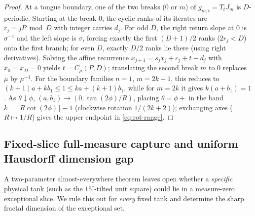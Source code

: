 \documentclass[11pt,reqno]{amsart}
\theoremstyle{definition}
\theoremstyle{remark}
\begin{document}
\begin{proof}
At a tongue boundary, one of the two breaks ($0$ or $m$) of $g_{m,t} = T_t J_m$ is $D$-periodic. Starting at the break $0$, the cyclic ranks of its iterates are $r_j = jP \bmod D$ with integer carries $d_j$. For odd $D$, the right return slope at $0$ is $\sigma^{-1}$ and the left slope is $\sigma$, forcing exactly the first $(D+1)/2$ ranks ($2r_j < D$) onto the first branch; for even $D$, exactly $D/2$ ranks lie there (using right derivatives). Solving the affine recurrence $x_{j+1} = s_j x_j + c_j + t - d_j$ with $x_0 = x_D = 0$ yields $t = C_\mu(P,D)$; translating the second break $m$ to $0$ replaces $\mu$ by $\mu^{-1}$. For the boundary families $n = 1$, $m = 2k+1$, this reduces to $(k+1)a + k b_1 \le 1 \le k a + (k+1)b_1$, while for $m = 2k$ it gives $k(a+b_1) = 1$. As $\theta \downarrow \phi$, $(a, b_1) \to (0, \tan(2\phi)/R)$, placing $\theta = \phi+$ in the band $k = \lceil R\cot(2\phi) \rceil - 1$ (clockwise rotation $1/(2k+2)$); exchanging axes ($R \mapsto 1/R$) gives the upper endpoint in \eqref{eq:rot-range}.
\end{proof}

\subsection{Fixed-slice full-measure capture and uniform Hausdorff dimension gap}
A two-parameter almost-everywhere theorem \cite[Thm.~3.2]{LBC2023} leaves open whether a \emph{specific} physical tank (such as the $15^\circ$-tilted unit square) could lie in a measure-zero exceptional slice. We rule this out for \emph{every} fixed tank and determine the sharp fractal dimension of the exceptional set.
\end{document}
